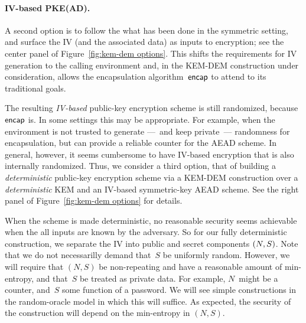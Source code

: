 \paragraph{IV-based PKE(AD). }
A second option is to follow the what has been done in the symmetric setting, and surface the IV (and the associated data) as inputs to encryption; see the center panel of Figure~\ref{fig:kem-dem options}.  
This shifts the requirements for IV generation to the calling environment and, in the KEM-DEM construction under consideration, allows the encapsulation algorithm~$\mathsf{encap}$ to attend to its traditional goals.  %

The resulting \emph{IV-based} public-key encryption scheme is still randomized, because $\mathsf{encap}$ is.  In some settings this may be appropriate.  For example, when the environment is not trusted to generate ---~and keep private~--- randomness for encapsulation, but can provide a reliable counter for the AEAD scheme.    In general, however, it seems cumbersome to have IV-based encryption that is also internally randomized.  
Thus, we consider a third option, that of building a \emph{deterministic} public-key encryption scheme via a KEM-DEM construction over a \emph{deterministic} KEM and an IV-based symmetric-key AEAD scheme.  See the right panel of Figure~\ref{fig:kem-dem options} for details.  


When the scheme is made deterministic, no reasonable security seems achievable when the all inputs are known by the adversary.  So for our fully deterministic construction, we separate the IV into public and secret components $(N,S)$.   
Note that we do not necessarilly demand that~$S$ be uniformly random.  However, we will require that $(N,S)$ be non-repeating and have a reasonable amount of min-entropy, and that~$S$ be treated as private data.   For example, $N$~might be a counter, and~$S$ some function of a password.  We will see simple constructions in the random-oracle model in which this will suffice. As expected, the security of the construction will depend on the min-entropy in $(N,S)$. 


